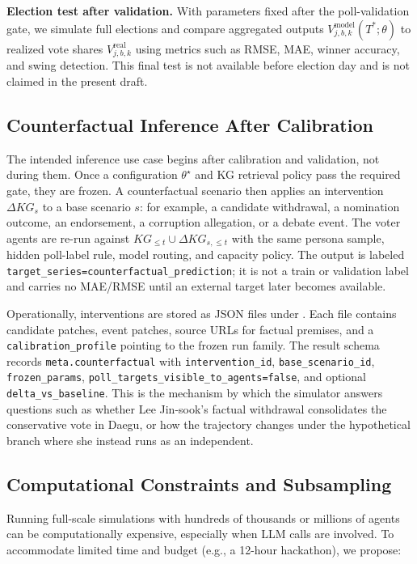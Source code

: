 \documentclass[11pt]{article}
\begin{document}
\textbf{Election test after validation.} With parameters fixed after the poll-validation gate, we simulate full elections and compare aggregated outputs $V^{\text{model}}_{j,b,k}(T^*; \theta)$ to realized vote shares $V^{\text{real}}_{j,b,k}$ using metrics such as RMSE, MAE, winner accuracy, and swing detection. This final test is not available before election day and is not claimed in the present draft.

\subsection{Counterfactual Inference After Calibration}

The intended inference use case begins after calibration and validation, not during them. Once a configuration $\theta^\star$ and KG retrieval policy pass the required gate, they are frozen. A counterfactual scenario then applies an intervention $\Delta KG_s$ to a base scenario $s$: for example, a candidate withdrawal, a nomination outcome, an endorsement, a corruption allegation, or a debate event. The voter agents are re-run against $KG_{\le t} \cup \Delta KG_{s,\le t}$ with the same persona sample, hidden poll-label rule, model routing, and capacity policy. The output is labeled \texttt{target\_series=counterfactual\_prediction}; it is not a train or validation label and carries no MAE/RMSE until an external target later becomes available.

Operationally, interventions are stored as JSON files under . Each file contains candidate patches, event patches, source URLs for factual premises, and a \texttt{calibration\_profile} pointing to the frozen run family. The result schema records \texttt{meta.counterfactual} with \texttt{intervention\_id}, \texttt{base\_scenario\_id}, \texttt{frozen\_params}, \texttt{poll\_targets\_visible\_to\_agents=false}, and optional \texttt{delta\_vs\_baseline}. This is the mechanism by which the simulator answers questions such as whether Lee Jin-sook's factual withdrawal consolidates the conservative vote in Daegu, or how the trajectory changes under the hypothetical branch where she instead runs as an independent.

\subsection{Computational Constraints and Subsampling}

Running full-scale simulations with hundreds of thousands or millions of agents can be computationally expensive, especially when LLM calls are involved. To accommodate limited time and budget (e.g., a 12-hour hackathon), we propose:
\end{document}
